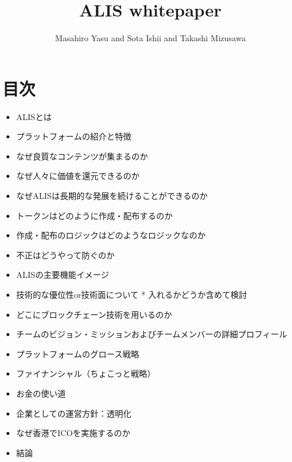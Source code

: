 \documentclass{jsarticle}
\begin{document}
\title{ALIS whitepaper}
\author{Masahiro Yasu and Sota Ishii and Takashi Mizusawa}
\maketitle

\section{目次}
\begin{itemize}
	\item ALISとは
	\item プラットフォームの紹介と特徴
	\item なぜ良質なコンテンツが集まるのか
	\item なぜ人々に価値を還元できるのか
	\item なぜALISは長期的な発展を続けることができるのか
	\item トークンはどのように作成・配布するのか
	\item 作成・配布のロジックはどのようなロジックなのか
	\item 不正はどうやって防ぐのか
	\item ALISの主要機能イメージ
	\item 技術的な優位性or技術面について * 入れるかどうか含めて検討
	\item どこにブロックチェーン技術を用いるのか
	\item チームのビジョン・ミッションおよびチームメンバーの詳細プロフィール
	\item プラットフォームのグロース戦略
	\item ファイナンシャル（ちょこっと戦略）
	\item お金の使い道
	\item 企業としての運営方針：透明化
	\item なぜ香港でICOを実施するのか
	\item 結論
\end{itemize}
\end{document}
